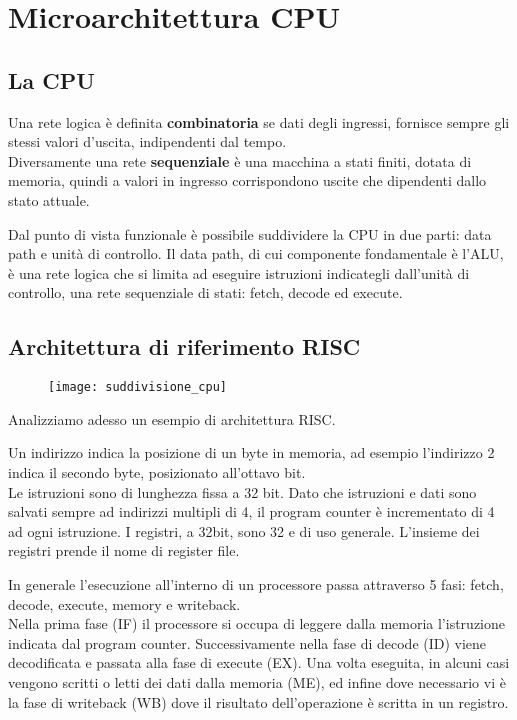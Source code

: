 \documentclass[../ace.tex]{subfiles}
\begin{document}
\section{Microarchitettura CPU}
\subsection{La CPU}
Una rete logica è definita \textbf{combinatoria} se dati degli ingressi, fornisce sempre gli stessi valori d'uscita, indipendenti dal tempo.
\\
Diversamente una rete \textbf{sequenziale} è una macchina a stati finiti, dotata di memoria, quindi a valori in ingresso corrispondono uscite che dipendenti dallo stato attuale.

Dal punto di vista funzionale è possibile suddividere la CPU in due parti: data path e unità di controllo.
Il data path, di cui componente fondamentale è l'ALU, è una rete logica che si limita ad eseguire istruzioni indicategli dall'unità di controllo, una rete sequenziale di stati: fetch, decode ed execute.

\subsection{Architettura di riferimento RISC}
\begin{figure}[h]
    \centering
    \texttt{[image: suddivisione\_cpu]}
\end{figure}
Analizziamo adesso un esempio di architettura RISC.

Un indirizzo indica la posizione di un byte in memoria, ad esempio l'indirizzo 2 indica il secondo byte, posizionato all'ottavo bit.
\\
Le istruzioni sono di lunghezza fissa a 32 bit.
Dato che istruzioni e dati sono salvati sempre ad indirizzi multipli di 4, il program counter è incrementato di 4 ad ogni istruzione.
I registri, a 32bit, sono 32 e di uso generale. L'insieme dei registri prende il nome di register file.

In generale l'esecuzione all'interno di un processore passa attraverso 5 fasi: fetch, decode, execute, memory e writeback.
\\
Nella prima fase (IF) il processore si occupa di leggere dalla memoria l'istruzione indicata dal program counter. Successivamente nella fase di decode (ID) viene decodificata e passata alla fase di execute (EX).
Una volta eseguita, in alcuni casi vengono scritti o letti dei dati dalla memoria (ME), ed infine dove necessario vi è la fase di writeback (WB) dove il risultato dell'operazione è scritta in un registro.
\end{document}
